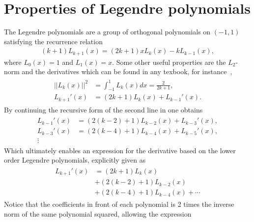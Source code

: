 
\chapter{Properties of Legendre polynomials} %

\label{AppendixA} %


The Legendre polynomials are a group of orthogonal polynomials on $(-1,1)$ satisfying the recurrence relation 
\begin{align}
    (k+1)L_{k+1}(x) = (2k+1)xL_{k}(x)-kL_{k-1}(x),
    \label{eq:Legendrerecursive}
\end{align}
where $L_0(x) = 1$ and $L_1(x) = x$. Some other useful properties are the $L_2$-norm and 
the derivatives which can be found in any texbook, for instance~\cite{Canuto},
\begin{align}
    \begin{split}
    ||L_k(x)||^2 &= \int_{-1}^1L_{k}(x)dx = \frac{2}{2k+1},  \\
    L_{k+1}'(x) &= (2k+1)L_k(x)+L_{k-1}'(x).
    \end{split}
    \label{eq:relations}
\end{align}
By continuing the recursive form of the second line in  one obtains
\begin{align}
    \begin{split}
    L_{k-1}'(x) &= (2(k-2)+1)L_{k-2}(x)+L_{k-3}'(x), \\
    L_{k-3}'(x) &= (2(k-4)+1)L_{k-4}(x)+L_{k-5}'(x), \\
    \vdots 
    \end{split}
    \label{eq:derivatives}
\end{align}
Which ultimately enables an expression for the derivative based on the lower order Legendre polynomials, explicitly given as 
\begin{align}
    \begin{split}
    L_{k+1}'(x) &= (2k+1)L_k(x)\\
    &+(2(k-2)+1)L_{k-2}(x)\\
    &+(2(k-4)+1)L_{k-4}(x)+\cdots 
    \end{split}
    \label{eq:der-explicit}
\end{align}
Notice that the coefficients in front of each polynomial is 2 times the inverse norm of the same polynomial squared, allowing the expression 
